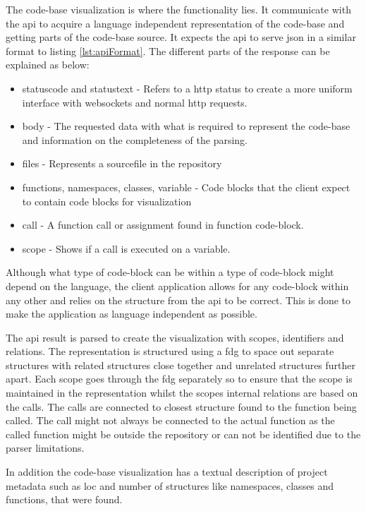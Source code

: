 The code-base visualization is where the functionality lies. It communicate with the \gls{api} to acquire a language independent representation of the code-base and getting parts of the code-base source. It expects the \gls{api} to serve \gls{json} in a similar format to listing \ref{lst:apiFormat}. The different parts of the response can be explained as below:
\begin{itemize}
    \item statuscode and statustext - Refers to a \gls{http} status to create a more uniform interface with \glspl{websocket} and normal \gls{http} requests.
    \item body - The requested data with what is required to represent the code-base and information on the completeness of the parsing.
    \item files - Represents a sourcefile in the repository
    \item functions, namespaces, classes, variable - Code blocks that the \gls{client} expect to contain code blocks for visualization
    \item call - A function call or assignment found in function code-block.
    \item scope - Shows if a call is executed on a variable.
\end{itemize}

Although what type of code-block can be within a type of code-block might depend on the language, the \gls{client} application allows for any code-block within any other and relies on the structure from the \gls{api} to be correct. This is done to make the application as language independent as possible.

The \gls{api} result is parsed to create the visualization with scopes, identifiers and relations. The representation is structured using a \gls{fdg} to space out separate structures with related structures close together and unrelated structures further apart. Each scope goes through the \gls{fdg} separately so to ensure that the scope is maintained in the representation whilst the scopes internal relations are based on the calls. The calls are connected to closest structure found to the function being called. The call might not always be connected to the actual function as the called function might be outside the repository or can not be identified due to the parser limitations. 

In addition the code-base visualization has a textual description of project metadata such as \gls{loc} and number of structures like \glspl{namespace}, classes and functions, that were found.

